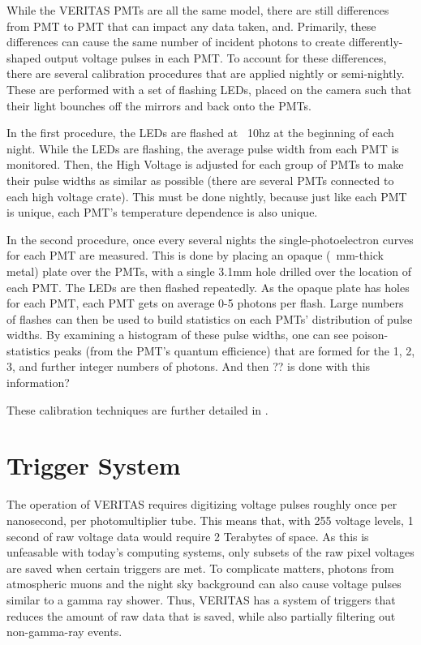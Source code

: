 While the VERITAS PMTs are all the same model, there are still differences from PMT to PMT that can impact any data taken, and.
Primarily, these differences can cause the same number of incident photons to create differently-shaped output voltage pulses in each PMT.
To account for these differences, there are several calibration procedures that are applied nightly or semi-nightly.
These are performed with a set of flashing LEDs, placed on the camera such that their light bounches off the mirrors and back onto the PMTs.

In the first procedure, the LEDs are flashed at ~10hz at the beginning of each night.
While the LEDs are flashing, the average pulse width from each PMT is monitored.
Then, the High Voltage is adjusted for each group of PMTs to make their pulse widths as similar as possible (there are several PMTs connected to each high voltage crate).
This must be done nightly, because just like each PMT is unique, each PMT's temperature dependence is also unique.

In the second procedure, once every several nights the single-photoelectron curves for each PMT are measured.
This is done by placing an opaque (~mm-thick metal) plate over the PMTs, with a single 3.1mm hole drilled over the location of each PMT.
The LEDs are then flashed repeatedly.
As the opaque plate has holes for each PMT, each PMT gets on average 0-5 photons per flash.
Large numbers of flashes can then be used to build statistics on each PMTs' distribution of pulse widths.
By examining a histogram of these pulse widths, one can see poison-statistics peaks (from the PMT's quantum efficience) that are formed for the 1, 2, 3, and further integer numbers of photons.
And then ?? is done with this information?

These calibration techniques are further detailed in \cite{calib_techniques}.


\section{Trigger System}\label{sec:trig}

The operation of VERITAS requires digitizing voltage pulses roughly once per nanosecond, per photomultiplier tube.
This means that, with 255 voltage levels, 1 second of raw voltage data would require 2 Terabytes of space.
As this is unfeasable with today's computing systems, only subsets of the raw pixel voltages are saved when certain triggers are met.
To complicate matters, photons from atmospheric muons and the night sky background can also cause voltage pulses similar to a gamma ray shower.
Thus, VERITAS has a system of triggers that reduces the amount of raw data that is saved, while also partially filtering out non-gamma-ray events.

